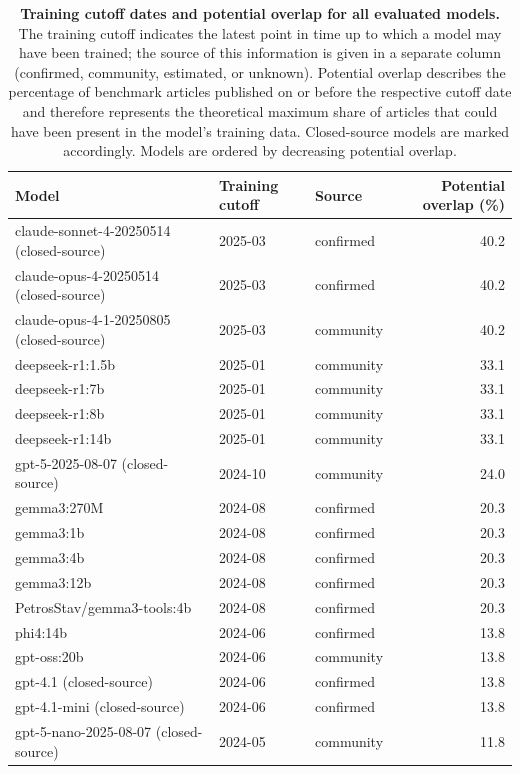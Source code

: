 \documentclass[12pt,letterpaper]{article}
\renewenvironment{table*}{\begin{table}}{\end{table}}
\begin{document}
\begin{table}[!htbp]
\centering
\scriptsize
\caption{\textbf{Training cutoff dates and potential overlap for all evaluated models.} 
The training cutoff indicates the latest point in time up to which a model may have been trained; the source of this information is given in a separate column (confirmed, community, estimated, or unknown). Potential overlap describes the percentage of benchmark articles published on or before the respective cutoff date and therefore represents the theoretical maximum share of articles that could have been present in the model's training data. Closed-source models are marked accordingly. Models are ordered by decreasing potential overlap.\label{tab:training_cutoff_overlap}}
\begin{tabularx}{\linewidth}{X l l r}
\toprule
\textbf{Model} & \textbf{Training cutoff} & \textbf{Source} & \textbf{Potential overlap (\%)} \\
\midrule
claude-sonnet-4-20250514 (closed-source) & 2025-03 & confirmed & 40.2 \\
claude-opus-4-20250514 (closed-source) & 2025-03 & confirmed & 40.2 \\
claude-opus-4-1-20250805 (closed-source) & 2025-03 & community & 40.2 \\
deepseek-r1:1.5b & 2025-01 & community & 33.1 \\
deepseek-r1:7b & 2025-01 & community & 33.1 \\
deepseek-r1:8b & 2025-01 & community & 33.1 \\
deepseek-r1:14b & 2025-01 & community & 33.1 \\
gpt-5-2025-08-07 (closed-source) & 2024-10 & community & 24.0 \\
gemma3:270M & 2024-08 & confirmed & 20.3 \\
gemma3:1b & 2024-08 & confirmed & 20.3 \\
gemma3:4b & 2024-08 & confirmed & 20.3 \\
gemma3:12b & 2024-08 & confirmed & 20.3 \\
PetrosStav/gemma3-tools:4b & 2024-08 & confirmed & 20.3 \\
phi4:14b & 2024-06 & confirmed & 13.8 \\
gpt-oss:20b & 2024-06 & community & 13.8 \\
gpt-4.1 (closed-source) & 2024-06 & confirmed & 13.8 \\
gpt-4.1-mini (closed-source) & 2024-06 & confirmed & 13.8 \\
gpt-5-nano-2025-08-07 (closed-source) & 2024-05 & community & 11.8 \\

\end{tabularx}
\end{table}
\end{document}
